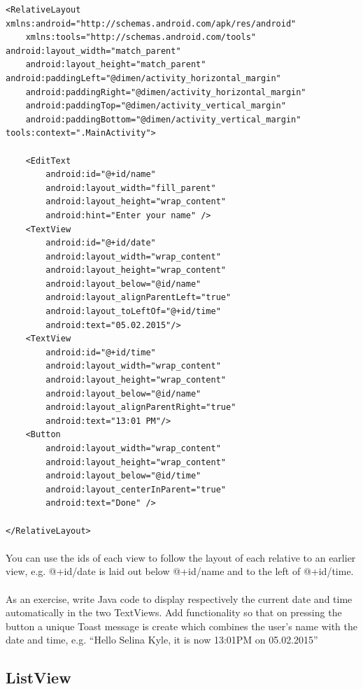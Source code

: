 \documentclass[12pt, a4paper, twoside]{book}
\begin{document}
\begin{lstlisting}
<RelativeLayout xmlns:android="http://schemas.android.com/apk/res/android"
    xmlns:tools="http://schemas.android.com/tools" android:layout_width="match_parent"
    android:layout_height="match_parent" android:paddingLeft="@dimen/activity_horizontal_margin"
    android:paddingRight="@dimen/activity_horizontal_margin"
    android:paddingTop="@dimen/activity_vertical_margin"
    android:paddingBottom="@dimen/activity_vertical_margin" tools:context=".MainActivity">

    <EditText
        android:id="@+id/name"
        android:layout_width="fill_parent"
        android:layout_height="wrap_content"
        android:hint="Enter your name" />
    <TextView
        android:id="@+id/date"
        android:layout_width="wrap_content"
        android:layout_height="wrap_content"
        android:layout_below="@id/name"
        android:layout_alignParentLeft="true"
        android:layout_toLeftOf="@+id/time"
        android:text="05.02.2015"/>
    <TextView
        android:id="@+id/time"
        android:layout_width="wrap_content"
        android:layout_height="wrap_content"
        android:layout_below="@id/name"
        android:layout_alignParentRight="true"
        android:text="13:01 PM"/>
    <Button
        android:layout_width="wrap_content"
        android:layout_height="wrap_content"
        android:layout_below="@id/time"
        android:layout_centerInParent="true"
        android:text="Done" />

</RelativeLayout>
\end{lstlisting}

\paragraph{} You can use the ids of each view to follow the layout of each relative to an earlier view, e.g. @+id/date is laid out below @+id/name and to the left of @+id/time.

\paragraph{} As an exercise, write Java code to display respectively the current date and time automatically in the two TextViews. Add functionality so that on pressing the button a unique Toast message is create which combines the user's name with the date and time, e.g. ``Hello Selina Kyle, it is now 13:01PM on 05.02.2015''

\subsection{ListView}
\end{document}
